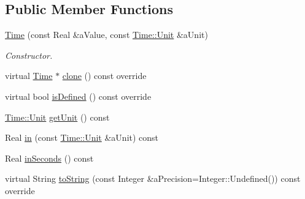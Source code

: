 \subsection*{Public Member Functions}
\begin{DoxyCompactItemize}
\item 
\hyperlink{classlibrary_1_1physics_1_1units_1_1_time_a60e2228b16ea9156a4c5ede4d7b141e5}{Time} (const Real \&a\+Value, const \hyperlink{classlibrary_1_1physics_1_1units_1_1_time_ab876a6a05c9a2f28905f2753bfd64109}{Time\+::\+Unit} \&a\+Unit)
\begin{DoxyCompactList}\small\item\em Constructor. \end{DoxyCompactList}\item 
virtual \hyperlink{classlibrary_1_1physics_1_1units_1_1_time}{Time} $\ast$ \hyperlink{classlibrary_1_1physics_1_1units_1_1_time_a8745ebee6707751e91137c3e87782b59}{clone} () const override
\item 
virtual bool \hyperlink{classlibrary_1_1physics_1_1units_1_1_time_ab62163386c3253277c5ba71782261cad}{is\+Defined} () const override
\item 
\hyperlink{classlibrary_1_1physics_1_1units_1_1_time_ab876a6a05c9a2f28905f2753bfd64109}{Time\+::\+Unit} \hyperlink{classlibrary_1_1physics_1_1units_1_1_time_ad058563b71fd972a66b647d6ca8b7fbe}{get\+Unit} () const
\item 
Real \hyperlink{classlibrary_1_1physics_1_1units_1_1_time_a88217c85038d0153f699166de8746383}{in} (const \hyperlink{classlibrary_1_1physics_1_1units_1_1_time_ab876a6a05c9a2f28905f2753bfd64109}{Time\+::\+Unit} \&a\+Unit) const
\item 
Real \hyperlink{classlibrary_1_1physics_1_1units_1_1_time_a8fb17118722828e091a29a665d402a8e}{in\+Seconds} () const
\item 
virtual String \hyperlink{classlibrary_1_1physics_1_1units_1_1_time_a6f56977493a45d334bb53bc4246888c4}{to\+String} (const Integer \&a\+Precision=Integer\+::\+Undefined()) const override
\end{DoxyCompactItemize}
